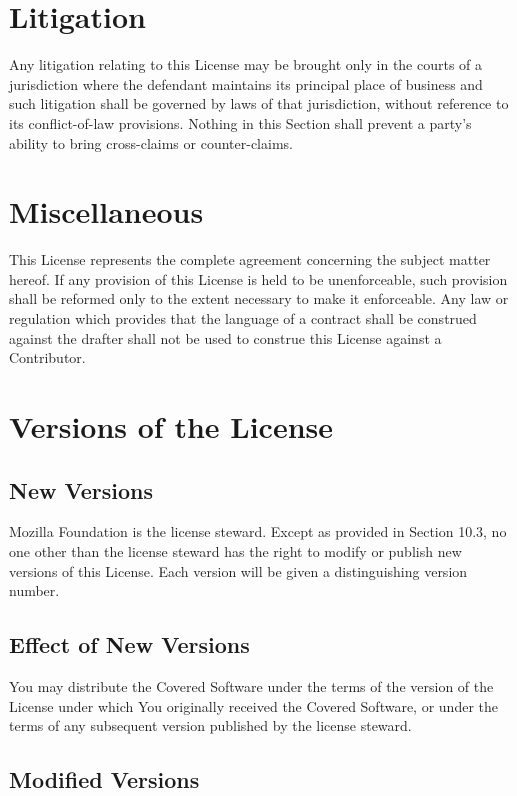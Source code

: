 \documentclass[a4paper, 12pt]{article}
\begin{document}
\section{Litigation}

Any litigation relating to this License may be brought only in the courts of a jurisdiction where the defendant maintains its principal place of business and such litigation shall be governed by laws of that jurisdiction, without reference to its conflict-of-law provisions. Nothing in this Section shall prevent a party's ability to bring cross-claims or counter-claims.

\section{Miscellaneous}

This License represents the complete agreement concerning the subject matter hereof. If any provision of this License is held to be unenforceable, such provision shall be reformed only to the extent necessary to make it enforceable. Any law or regulation which provides that the language of a contract shall be construed against the drafter shall not be used to construe this License against a Contributor.

\section{Versions of the License}

\subsection{New Versions}

Mozilla Foundation is the license steward. Except as provided in Section 10.3, no one other than the license steward has the right to modify or publish new versions of this License. Each version will be given a distinguishing version number.

\subsection{Effect of New Versions}

You may distribute the Covered Software under the terms of the version of the License under which You originally received the Covered Software, or under the terms of any subsequent version published by the license steward.

\subsection{Modified Versions}
\end{document}
